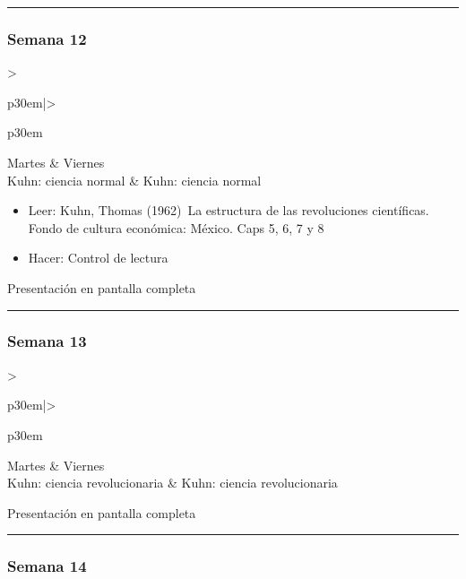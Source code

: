 \documentclass[spanish,]{article}
\begin{document}
\begin{center}\rule{0.5\linewidth}{\linethickness}\end{center}

\subsubsection{Semana 12}\label{semana-12}

\begin{tabular}{>{\raggedright\arraybackslash}p{30em}|>{\raggedright\arraybackslash}p{30em}}
\hline
Martes & Viernes\\
\hline
Kuhn: ciencia normal & Kuhn: ciencia normal\\
\hline
\end{tabular}

\begin{itemize}
\item
  Leer: Kuhn, Thomas (1962)~La estructura de las revoluciones
  científicas. Fondo de cultura económica: México. Caps 5, 6, 7 y 8
\item
  Hacer: Control de lectura
\end{itemize}

Presentación en pantalla completa

\begin{center}\rule{0.5\linewidth}{\linethickness}\end{center}

\subsubsection{Semana 13}\label{semana-13}

\begin{tabular}{>{\raggedright\arraybackslash}p{30em}|>{\raggedright\arraybackslash}p{30em}}
\hline
Martes & Viernes\\
\hline
Kuhn: ciencia revolucionaria & Kuhn: ciencia revolucionaria\\
\hline
\end{tabular}

Presentación en pantalla completa

\begin{center}\rule{0.5\linewidth}{\linethickness}\end{center}

\subsubsection{Semana 14}\label{semana-14}
\end{document}

